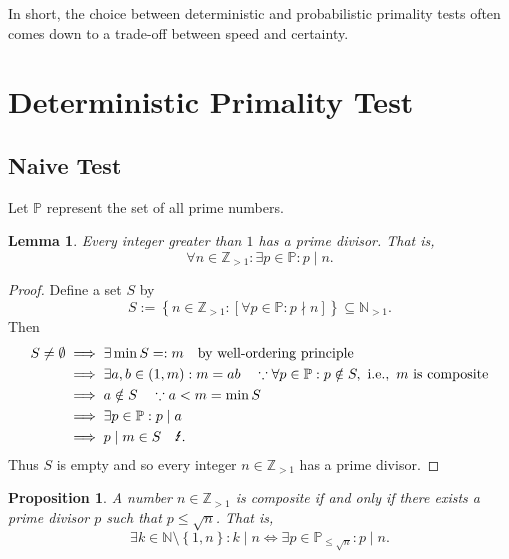 \documentclass[12pt,openany]{book}
\newtheorem{proposition}[theorem]{Proposition}
\newtheorem{lemma}[theorem]{Lemma}
\theoremstyle{definition}
\newcommand{\set}[1]{\left\{#1\right\}}
\newcommand{\N}{\mathbb{N}}
\newcommand{\Z}{\mathbb{Z}}
\newcommand{\ie}{\textnormal{i.e.}}
\newcommand{\of}[1]{\left( #1 \right)}
\newcommand{\contr}{\textup{\Lightning}}
\begin{document}
	In short, the choice between deterministic and probabilistic primality tests often comes down to a trade-off between speed and certainty.
	
	\newpage
	\section{Deterministic Primality Test}
	\subsection{Naive Test}
	Let $\mathbb{P}$ represent the set of all prime numbers.
	\vspace{4pt}
	\begin{tcolorbox}[colback=white,colframe=lemcolor,arc=5pt,title={\color{white}\bf }]
		\begin{lemma}
			Every integer greater than $1$ has a prime divisor. That is, \[
			\forall n\in\Z_{>1}:\exists p\in\mathbb{P}: p\mid n.
			\]
		\end{lemma}
	\end{tcolorbox}
	\begin{proof}
		Define a set $S$ by \[
		S:=\set{n\in\Z_{>1}:\left[\forall p\in\mathbb{P}:p\nmid n\right]}\subseteq\N_{>1}.
		\] Then \begin{align*}
			S\neq\emptyset&\implies\exists\min S=:m\quad\textnormal{by well-ordering principle}\\
			&\implies\exists a,b\in\of{1,m}:m=ab\quad\because \forall p\in\mathbb{P}:p\notin S,\ \ie,\ \text{$m$ is composite}\\
			&\implies a\notin S\quad\because a<m=\min S\\
			&\implies\exists p\in\mathbb{P}:p\mid a\\
			&\implies p\mid m\in S\quad\contr.
		\end{align*} Thus $S$ is empty and so every integer $n\in\Z_{>1}$ has a prime divisor.
	\end{proof}
	\vspace{8pt}
	\begin{tcolorbox}[colback=white,colframe=procolor,arc=5pt,title={\color{white}\bf }]
		\begin{proposition}
			A number $n\in\Z_{>1}$ is composite if and only if there exists a prime divisor $p$ such that $p\leq\sqrt{n}$. That is, \[
			\exists k\in\N\setminus\set{1,n}:k\mid n\iff \exists p\in\mathbb{P}_{\leq\sqrt{n}}:p\mid n.
			\]
		\end{proposition}
	\end{tcolorbox}
\end{document}
